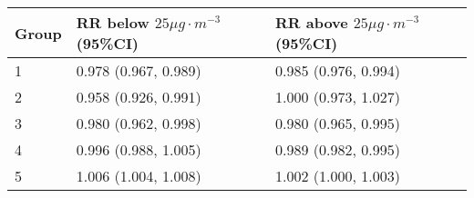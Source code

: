 \begin{tabular}{lll}
  \hline
Group & RR below $25 \mu g \cdot m^{-3}$ (95\%CI) & RR above $25 \mu g \cdot m^{-3}$ (95\%CI) \\ 
  \hline
   1 & 0.978 (0.967, 0.989) & 0.985 (0.976, 0.994) \\ 
     2 & 0.958 (0.926, 0.991) & 1.000 (0.973, 1.027) \\ 
     3 & 0.980 (0.962, 0.998) & 0.980 (0.965, 0.995) \\ 
     4 & 0.996 (0.988, 1.005) & 0.989 (0.982, 0.995) \\ 
     5 & 1.006 (1.004, 1.008) & 1.002 (1.000, 1.003) \\ 
   \hline
\end{tabular}

